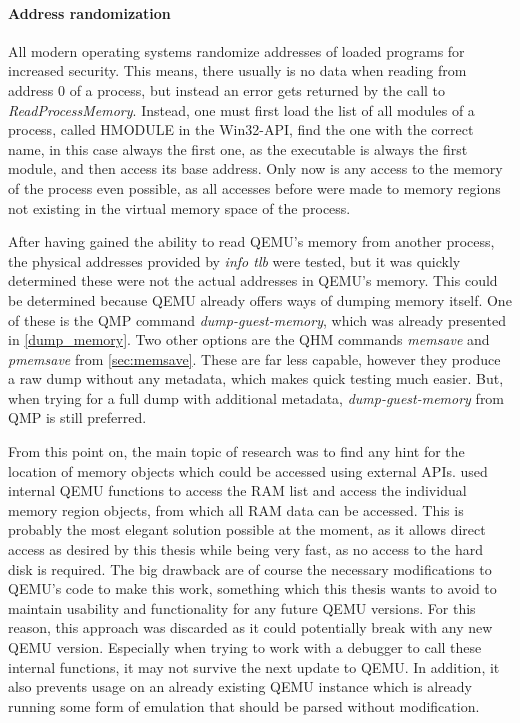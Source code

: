\paragraph{Address randomization}
All modern operating systems randomize addresses of loaded programs for increased security.
This means, there usually is no data when reading from address 0 of a process,
but instead an error gets returned by the call to \emph{ReadProcessMemory}.
Instead, one must first load the list of all modules of a process,
called HMODULE in the Win32-API, find the one with the correct name,
in this case always the first one, as the executable is always the first module,
and then access its base address.
Only now is any access to the memory of the process even possible,
as all accesses before were made to memory regions
not existing in the virtual memory space of the process.

After having gained the ability to read QEMU's memory from another process,
the physical addresses provided by \emph{info tlb} were tested,
but it was quickly determined these were not the actual addresses in QEMU's memory.
This could be determined because QEMU already offers ways of dumping memory itself.
One of these is the QMP command \emph{dump-guest-memory},
which was already presented in \autoref{dump_memory}.
Two other options are the QHM commands \emph{memsave} and \emph{pmemsave} from \autoref{sec:memsave}.
These are far less capable, however they produce a raw dump without any metadata,
which makes quick testing much easier.
But, when trying for a full dump with additional metadata,
\emph{dump-guest-memory} from QMP is still preferred.

From this point on, the main topic of research was to find any hint for the location of memory objects
which could be accessed using external APIs.
 used internal QEMU functions to access the RAM list
and access the individual memory region objects,
from which all RAM data can be accessed\cite{kitcheckpoints}.
This is probably the most elegant solution possible at the moment,
as it allows direct access as desired by this thesis
while being very fast, as no access to the hard disk is required.
The big drawback are of course the necessary modifications to QEMU's code to make this work,
something which this thesis wants to avoid to maintain usability and functionality for any future QEMU versions.
For this reason, this approach was discarded as it could potentially break with any new QEMU version.
Especially when trying to work with a debugger to call these internal functions,
it may not survive the next update to QEMU.
In addition, it also prevents usage on an already existing QEMU instance
which is already running some form of emulation that should be parsed without modification.

